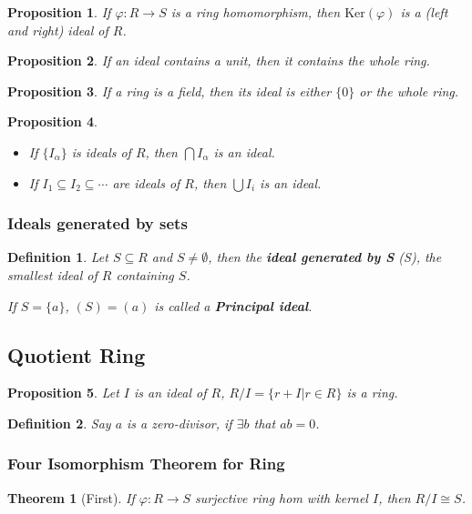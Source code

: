 \documentclass[12pt]{article}
\newtheorem{definition}{Definition}[subsection]
\newtheorem{theorem}{Theorem}[subsection]
\newtheorem{proposition}{Proposition}[subsection]
\begin{document}
		\begin{proposition}
			If $\varphi: R \rightarrow S$ is a ring homomorphism, then $\mathrm{Ker}(\varphi)$ is a (left and right) ideal of $R$.
		\end{proposition}
		
		\begin{proposition}
			If an ideal contains a unit, then it contains the whole ring.
		\end{proposition}
		
		\begin{proposition}
			If a ring is a field, then its ideal is either $\{0\} $ or the whole ring.
		\end{proposition}
		
		\begin{proposition}
			\begin{itemize}
				\item If $\{I_{\alpha}\}$ is ideals of $R$, then $\bigcap I_{\alpha}$ is an ideal.
				\item If $I_1 \subseteq I_2 \subseteq \cdots$ are ideals of $R$, then $\bigcup I_i$ is an ideal.
			\end{itemize}
		\end{proposition}
		
		\subsubsection{Ideals generated by sets}
			\begin{definition}
				Let $S \subseteq R$ and $S \neq \emptyset$, then the \textbf{ideal generated by S} (S), the smallest ideal of $R$ containing $S$.
				
				If $S = \{a\}$, $(S) = (a)$ is called a \textbf{Principal ideal}.
			\end{definition}
		\subsection{Quotient Ring}
			\begin{proposition}
				Let $I$ is an ideal of $R$, $R/I = \{r + I | r \in R\}$ is a ring.
			\end{proposition}
			
			\begin{definition}
				Say $a$ is a zero-divisor, if $\exists b$ that $ab = 0$.
			\end{definition}
			
			
			\subsubsection{Four Isomorphism Theorem for Ring}
			\begin{theorem}[First]
			 If $\varphi: R \rightarrow S$ surjective ring hom with kernel $I$, then $R/I \cong S$.	
			\end{theorem}
\end{document}
